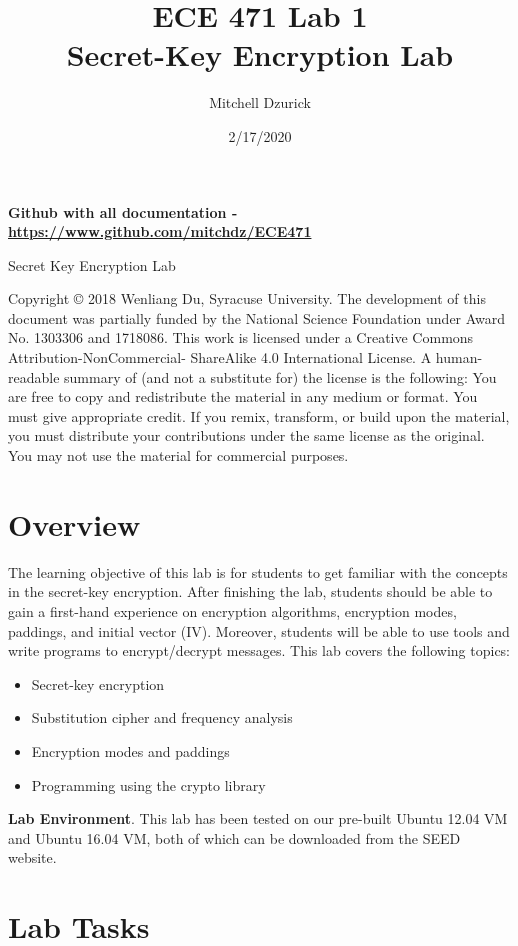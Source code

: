 \documentclass[12pt]{article}
\title {{\bf ECE 471 Lab 1} \\
\large{Secret-Key Encryption Lab}}
\author{Mitchell Dzurick}
\date{2/17/2020}
\begin{document}
\maketitle
\textbf{Github with all documentation - \url{https://www.github.com/mitchdz/ECE471}}
\tableofcontents 

\clearpage


Secret Key Encryption Lab

Copyright © 2018 Wenliang Du, Syracuse University. The development of this document was partially funded by the National
Science Foundation under Award No. 1303306 and 1718086. This work is licensed under a Creative Commons
Attribution-NonCommercial- ShareAlike 4.0 International License. A human-readable summary of (and not a substitute for)
the license is the following: You are free to copy and redistribute the material in any medium or format. You must give
appropriate credit. If you remix, transform, or build upon the material, you must distribute your contributions under the
same license as the original. You may not use the material for commercial purposes.

\section{Overview}

The learning objective of this lab is for students to get familiar with the concepts in the secret-key encryption. After
finishing the lab, students should be able to gain a first-hand experience on encryption algorithms, encryption modes,
paddings, and initial vector (IV). Moreover, students will be able to use tools and write programs to encrypt/decrypt
messages. This lab covers the following topics:

    \begin{itemize}
        \item Secret-key encryption
        \item Substitution cipher and frequency analysis
        \item Encryption modes and paddings
        \item Programming using the crypto library
    \end{itemize}

\textbf{Lab Environment}. This lab has been tested on our pre-built Ubuntu 12.04 VM and Ubuntu 16.04 VM, both of which
can be downloaded from the SEED website.

\clearpage

\section{Lab Tasks}
\clearpage
\end{document}
